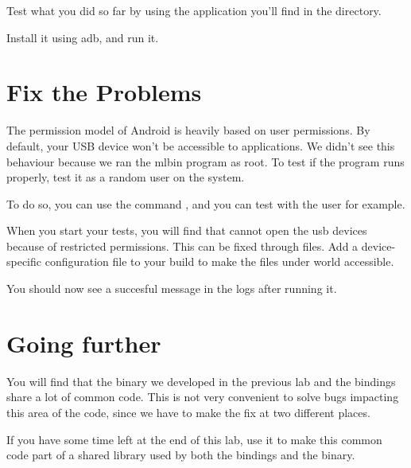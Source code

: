 Test what you did so far by using the  application
you'll find in the  directory.

Install it using adb, and run it.

\section{Fix the Problems}

The permission model of Android is heavily based on user
permissions. By default, your USB device won't be accessible to
applications. We didn't see this behaviour because we ran the mlbin
program as root. To test if the program runs properly, test it as a
random user on the system.

To do so, you can use the command , and you can test with the
user  for example.

When you start your tests, you will find that  cannot
open the usb devices because of restricted permissions. This can be
fixed through  files. Add a device-specific
 configuration file to your build to make the files
under  world accessible.

You should now see a succesful message in the logs after running it.

\section{Going further}

You will find that the binary we developed in the previous lab and
the bindings share a lot of common code. This is not very convenient
to solve bugs impacting this area of the code, since we have to make
the fix at two different places.

If you have some time left at the end of this lab, use it to make this
common code part of a shared library used by both the bindings and the
binary.
